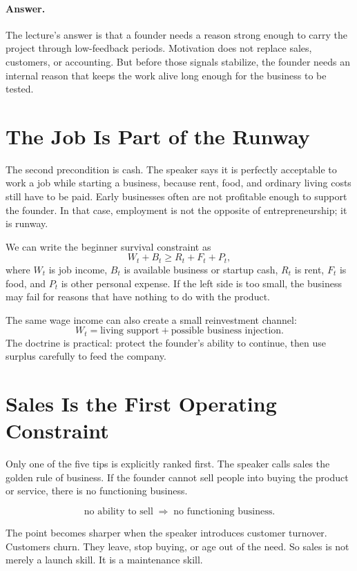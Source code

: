 \documentclass[11pt,oneside]{book}
\begin{document}
\paragraph{Answer.}
The lecture's answer is that a founder needs a reason strong enough to carry the project through low-feedback periods. Motivation does not replace sales, customers, or accounting. But before those signals stabilize, the founder needs an internal reason that keeps the work alive long enough for the business to be tested.

\section{The Job Is Part of the Runway}

The second precondition is cash. The speaker says it is perfectly acceptable to work a job while starting a business, because rent, food, and ordinary living costs still have to be paid. Early businesses often are not profitable enough to support the founder. In that case, employment is not the opposite of entrepreneurship; it is runway.

We can write the beginner survival constraint as
\[
W_t+B_t\geq R_t+F_t+P_t,
\]
where \(W_t\) is job income, \(B_t\) is available business or startup cash, \(R_t\) is rent, \(F_t\) is food, and \(P_t\) is other personal expense. If the left side is too small, the business may fail for reasons that have nothing to do with the product.

The same wage income can also create a small reinvestment channel:
\[
W_t=\text{living support}+\text{possible business injection}.
\]
The doctrine is practical: protect the founder's ability to continue, then use surplus carefully to feed the company.

\section{Sales Is the First Operating Constraint}

Only one of the five tips is explicitly ranked first. The speaker calls sales the golden rule of business. If the founder cannot sell people into buying the product or service, there is no functioning business.

\[
\text{no ability to sell}
\;\Longrightarrow\;
\text{no functioning business}.
\]

The point becomes sharper when the speaker introduces customer turnover. Customers churn. They leave, stop buying, or age out of the need. So sales is not merely a launch skill. It is a maintenance skill.
\end{document}
